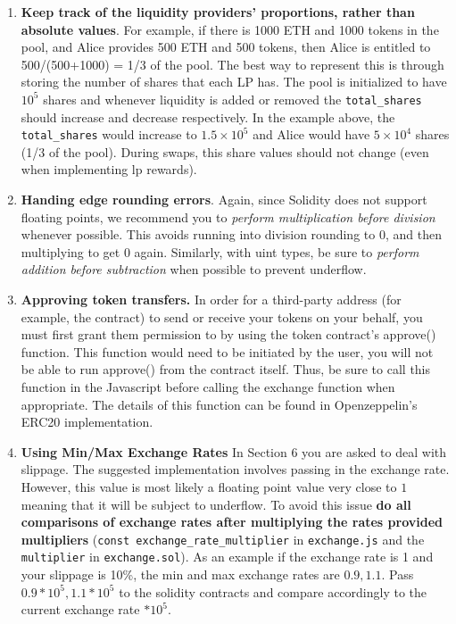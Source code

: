 \documentclass[11pt]{article}
\begin{document}
\begin{enumerate}
    \item \textbf{Keep track of the liquidity providers' proportions, rather than absolute values}. For example, if there is 1000 ETH and 1000 tokens in the pool, and Alice provides 500 ETH and 500 tokens, then Alice is entitled to 500/(500+1000) = 1/3 of the pool. The best way to represent this is through storing the number of shares that each LP has. The pool is initialized to have $10^{5}$ shares and whenever liquidity is added or removed the \texttt{total\_shares} should increase and decrease respectively. In the example above, the \texttt{total\_shares} would increase to $1.5 \times 10^5$ and Alice would have $5 \times 10^4$ shares (1/3 of the pool). During swaps, this share values should not change (even when implementing lp rewards).
    \item \textbf{Handing edge rounding errors}. Again, since Solidity does not support floating points, we recommend you to \textit{perform multiplication before division} whenever possible. This avoids running into division rounding to 0, and then multiplying to get 0 again. Similarly, with uint types, be sure to \textit{perform addition before subtraction} when possible to prevent underflow. 
    
    \item \textbf{Approving token transfers.} In order for a third-party address (for example, the contract) to send or receive your tokens on your behalf, you must first grant them permission to by using the token contract's approve() function. This function would need to be initiated by the user, you will not be able to run approve() from the contract itself. Thus, be sure to call this function in the Javascript before calling the exchange function when appropriate. The details of this function can be found in Openzeppelin's ERC20 implementation.

    \item \textbf{Using Min/Max Exchange Rates} In Section 6 you are asked to deal with slippage. The suggested implementation involves passing in the exchange rate. However, this value is most likely a floating point value very close to $1$ meaning that it will be subject to underflow. To avoid this issue \textbf{do all comparisons of exchange rates after multiplying the rates provided multipliers} (\texttt{const exchange\_rate\_multiplier} in \texttt{exchange.js} and the \texttt{multiplier} in \texttt{exchange.sol}).  As an example if the exchange rate is 1 and your slippage is 10\%, the min and max exchange rates are $0.9, 1.1$. Pass $0.9 * 10^5, 1.1 * 10^5$ to the solidity contracts and compare accordingly to the current exchange rate $* 10^5$.
    

\end{enumerate}
\end{document}
